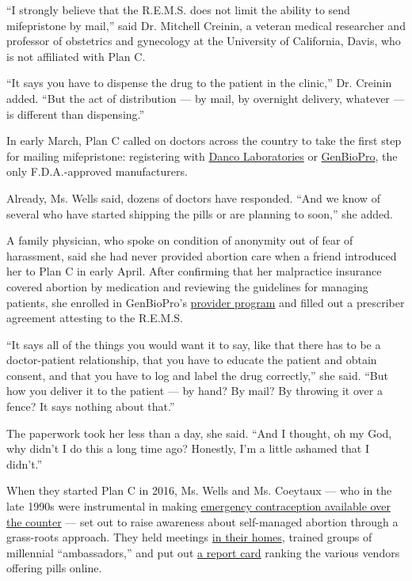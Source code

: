 ``I strongly believe that the R.E.M.S. does not limit the ability to
send mifepristone by mail,'' said Dr. Mitchell Creinin, a veteran
medical researcher and professor of obstetrics and gynecology at the
University of California, Davis, who is not affiliated with Plan C.

``It says you have to dispense the drug to the patient in the clinic,''
Dr. Creinin added. ``But the act of distribution --- by mail, by
overnight delivery, whatever --- is different than dispensing.''

In early March, Plan C called on doctors across the country to take the
first step for mailing mifepristone: registering with
\href{https://www.nytimes.com/2000/09/30/us/abortion-pill-distributor-energized-by-new-mission.html}{Danco
Laboratories} or \href{https://genbiopro.com/prescribing/}{GenBioPro},
the only F.D.A.-approved manufacturers.

Already, Ms. Wells said, dozens of doctors have responded. ``And we know
of several who have started shipping the pills or are planning to
soon,'' she added.

A family physician, who spoke on condition of anonymity out of fear of
harassment, said she had never provided abortion care when a friend
introduced her to Plan C in early April. After confirming that her
malpractice insurance covered abortion by medication and reviewing the
guidelines for managing patients, she enrolled in GenBioPro's
\href{https://genbiopro.com/ordering/}{provider program} and filled out
a prescriber agreement attesting to the R.E.M.S.

``It says all of the things you would want it to say, like that there
has to be a doctor-patient relationship, that you have to educate the
patient and obtain consent, and that you have to log and label the drug
correctly,'' she said. ``But how you deliver it to the patient --- by
hand? By mail? By throwing it over a fence? It says nothing about
that.''

The paperwork took her less than a day, she said. ``And I thought, oh my
God, why didn't I do this a long time ago? Honestly, I'm a little
ashamed that I didn't.''

When they started Plan C in 2016, Ms. Wells and Ms. Coeytaux --- who in
the late 1990s were instrumental in making
\href{https://www.whijournal.com/article/S1049-3867(00)00072-4/fulltext}{emergency
contraception available over the counter} --- set out to raise awareness
about self-managed abortion through a grass-roots approach. They held
meetings
\href{https://www.nytimes.com/2017/04/27/opinion/spreading-plan-c-to-end-pregnancy.html?_r=0}{in
their homes}, trained groups of millennial ``ambassadors,'' and put out
\href{http://cdn.cnn.com/cnn/2018/images/10/22/plancreportcardnew.pdf}{a
report card} ranking the various vendors offering pills online.

